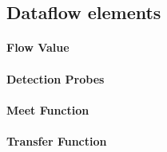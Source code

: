 \subsection{Dataflow elements}
\label{ss:dataflow}

\paragraph{Flow Value}

\paragraph{Detection Probes}

\paragraph{Meet Function}

\paragraph{Transfer Function}

